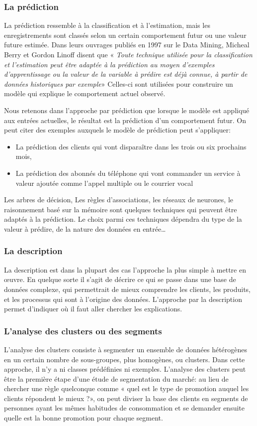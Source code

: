 \documentclass[11pt,a4paper]{report}
\begin{document}
\subsubsection{La prédiction}
La prédiction ressemble à la classification et à l’estimation, mais les enregistrements sont classés selon un certain comportement futur ou une valeur future estimée.  Dans leurs ouvrages publiés en 1997 sur le Data Mining, Micheal Berry et Gordon Linoff disent que « \textit{Toute technique utilisée pour la classification et l’estimation peut être adaptée à la prédiction au moyen d’exemples d’apprentissage ou la valeur de la variable à prédire est déjà connue, à partir de données historiques par exemple}» Celles-ci sont utilisées pour construire un modèle qui explique le comportement actuel observé. \newline

Nous retenons dans l’approche par prédiction que lorsque le modèle est appliqué aux entrées actuelles, le résultat est la prédiction d’un comportement futur.  On peut citer des exemples auxquels le modèle de prédiction peut s’appliquer: 

\begin{itemize}
\item La prédiction des clients qui vont disparaître dans les trois ou six prochains mois,
\item La prédiction des abonnés du téléphone qui vont commander un service à valeur ajoutée comme l’appel multiple ou le courrier vocal
\end{itemize}
Les arbres de décision, Les règles d’associations, les réseaux de neurones, le raisonnement basé sur la mémoire sont quelques techniques qui peuvent être adaptés à la prédiction. Le choix parmi ces techniques dépendra du type de la valeur à prédire, de la nature des données en entrée…

\subsubsection{La description}
La description est dans la plupart des cas l’approche la plus simple à mettre en œuvre. En quelque sorte il s’agit de décrire ce qui se passe dans une base de données complexe, qui permettrait de mieux comprendre les clients, les produits, et les processus qui sont à l’origine des données. L’approche par la description permet d’indiquer où il faut aller chercher les explications. 

\subsubsection{L'analyse des clusters ou des segments}
L’analyse des clusters consiste à segmenter un ensemble de données hétérogènes en un certain  nombre de sous-groupes, plus homogènes, ou clusters. Dans cette approche, il n’y a ni classes prédéfinies ni exemples. L’analyse des clusters peut être la première étape d'une étude de segmentation du marché: au lieu de chercher une règle quelconque comme « quel est le type de promotion auquel les clients répondent le mieux ?», on peut diviser la base des clients en segments de personnes ayant les mêmes habitudes de consommation et se demander ensuite quelle est la bonne promotion pour chaque segment. 
\end{document}
